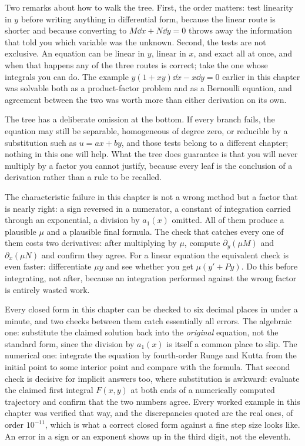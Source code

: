 Two remarks about how to walk the tree. First, the order matters: test linearity in $y$ before writing anything in differential form, because the linear route is shorter and because converting to $M\dd x+N\dd y=0$ throws away the information that told you which variable was the unknown. Second, the tests are not exclusive. An equation can be linear in $y$, linear in $x$, and exact all at once, and when that happens any of the three routes is correct; take the one whose integrals you can do. The example $y(1+xy)\dd x-x\dd y=0$ earlier in this chapter was solvable both as a product-factor problem and as a Bernoulli equation, and agreement between the two was worth more than either derivation on its own.

The tree has a deliberate omission at the bottom. If every branch fails, the equation may still be separable, homogeneous of degree zero, or reducible by a substitution such as $u=ax+by$, and those tests belong to a different chapter; nothing in this one will help. What the tree does guarantee is that you will never multiply by a factor you cannot justify, because every leaf is the conclusion of a derivation rather than a rule to be recalled.

\begin{keynote}
The characteristic failure in this chapter is not a wrong method but a factor that is nearly right: a sign reversed in a numerator, a constant of integration carried through an exponential, a division by $a_1(x)$ omitted. All of them produce a plausible $\mu$ and a plausible final formula. The check that catches every one of them costs two derivatives: after multiplying by $\mu$, compute $\partial_y(\mu M)$ and $\partial_x(\mu N)$ and confirm they agree. For a linear equation the equivalent check is even faster: differentiate $\mu y$ and see whether you get $\mu(y'+Py)$. Do this before integrating, not after, because an integration performed against the wrong factor is entirely wasted work.
\end{keynote}

\begin{keynote}
Every closed form in this chapter can be checked to six decimal places in under a minute, and two checks between them catch essentially all errors. The algebraic one: substitute the claimed solution back into the \emph{original} equation, not the standard form, since the division by $a_1(x)$ is itself a common place to slip. The numerical one: integrate the equation by fourth-order Runge and Kutta from the initial point to some interior point and compare with the formula. That second check is decisive for implicit answers too, where substitution is awkward: evaluate the claimed first integral $F(x,y)$ at both ends of a numerically computed trajectory and confirm that the two numbers agree. Every worked example in this chapter was verified that way, and the discrepancies quoted are the real ones, of order $10^{-11}$, which is what a correct closed form against a fine step size looks like. An error in a sign or an exponent shows up in the third digit, not the eleventh.
\end{keynote}

